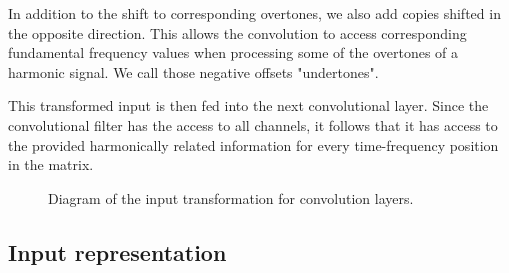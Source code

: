 \documentclass{article}
\begin{document}
In addition to the shift to corresponding overtones, we also add copies shifted in the opposite direction. This allows the convolution to access corresponding fundamental frequency values when processing some of the overtones of a harmonic signal. We call those negative offsets "undertones".

This transformed input is then fed into the next convolutional layer. Since the convolutional filter has the access to all channels, it follows that it has access to the provided harmonically related information for every time-frequency position in the matrix.

\begin{figure}
 \centerline{}
 \caption{Diagram of the input transformation for convolution layers.}
 \label{fig:hcnn_transform}
\end{figure}

\subsection{Input representation}
\end{document}

